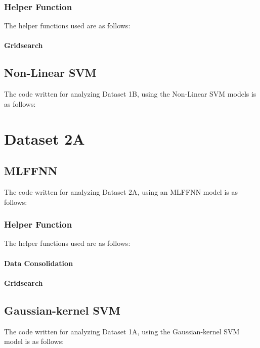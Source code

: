 \documentclass[11pt,a4paper]{article}
\begin{document}
\subsubsection{Helper Function}
The helper functions used are as follows:\vspace{-1em}
\paragraph{Gridsearch}
\vspace{-1.5em}


\subsection{Non-Linear SVM}
The code written for analyzing Dataset 1B, using the Non-Linear SVM models is as follows:\vspace{-1em}


\section{Dataset 2A}
\subsection{MLFFNN}
The code written for analyzing Dataset 2A, using an MLFFNN model is as follows:\vspace{-1em}


\subsubsection{Helper Function}
The helper functions used are as follows:\vspace{-1em}
\paragraph{Data Consolidation}
\vspace{-1.5em}

\paragraph{Gridsearch}
\vspace{-1.5em}



\subsection{Gaussian-kernel SVM}
The code written for analyzing Dataset 1A, using the Gaussian-kernel SVM model is as follows:\vspace{-1em}

\end{document}
